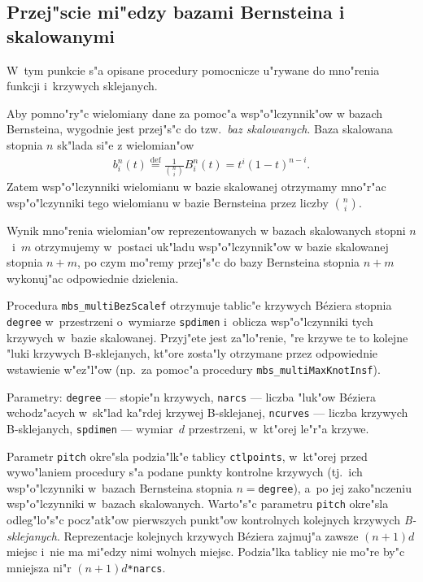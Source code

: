 \newpage
\subsection{Przej"scie mi"edzy bazami Bernsteina i skalowanymi}

W~tym punkcie s"a opisane procedury pomocnicze u"rywane do mno"renia funkcji
i~krzywych sklejanych.

Aby pomno"ry"c wielomiany dane za pomoc"a wsp"o"lczynnik"ow w bazach
Bernsteina, wygodnie jest przej"s"c do tzw.\ \emph{baz skalowanych}. Baza
skalowana stopnia $n$ sk"lada si"e z wielomian"ow
\begin{align}
  b^n_i(t) \stackrel{\mathrm{def}}{=} \frac{1}{\binom{n}{i}}B^n_i(t) =
  t^i(1-t)^{n-i}.
\end{align}
Zatem wsp"o"lczynniki wielomianu w bazie skalowanej otrzymamy mno"r"ac
wsp"o"lczynniki tego wielomianu w bazie Bernsteina przez liczby
$\binom{n}{i}$.

Wynik mno"renia wielomian"ow reprezentowanych w bazach skalowanych stopni
$n$~i~$m$ otrzymujemy w~postaci uk"ladu wsp"o"lczynnik"ow w bazie skalowanej
stopnia $n+m$, po czym mo"remy przej"s"c do bazy Bernsteina stopnia $n+m$
wykonuj"ac odpowiednie dzielenia.

\vspace{\bigskipamount}
Procedura \texttt{mbs\_multiBezScalef} otrzymuje tablic"e krzywych
B\'{e}ziera stopnia \texttt{degree} w~przestrzeni o~wymiarze \texttt{spdimen}
i~oblicza wsp"o"lczynniki tych krzywych w~bazie skalowanej. Przyj"ete jest
za"lo"renie, "re krzywe te to kolejne "luki krzywych B-sklejanych, kt"ore
zosta"ly otrzymane przez odpowiednie wstawienie w"ez"l"ow (np.\ za pomoc"a
procedury \texttt{mbs\_multiMaxKnotInsf}).

\begin{sloppypar}
Parametry: \texttt{degree} --- stopie"n krzywych, \texttt{narcs} --- liczba
"luk"ow B\'{e}ziera wchodz"acych w~sk"lad ka"rdej krzywej B-sklejanej,
\texttt{ncurves} --- liczba krzywych B-sklejanych, \texttt{spdimen} ---
wymiar~$d$ przestrzeni, w~kt"orej le"r"a krzywe.
\end{sloppypar}

Parametr \texttt{pitch} okre"sla podzia"lk"e tablicy \texttt{ctlpoints},
w~kt"orej przed wywo"laniem procedury s"a podane punkty kontrolne krzywych
(tj.\ ich wsp"o"lczynniki w~bazach Bernsteina stopnia $n=$\texttt{degree}),
a~po jej zako"nczeniu wsp"o"lczynniki w~bazach skalowanych.
Warto"s"c parametru \texttt{pitch} okre"sla odleg"lo"s"c pocz"atk"ow
pierwszych punkt"ow kontrolnych kolejnych krzywych \emph{B-sklejanych}.
Reprezentacje kolejnych krzywych B\'{e}ziera zajmuj"a zawsze $(n+1)d$
miejsc i~nie ma mi"edzy nimi wolnych miejsc. Podzia"lka tablicy nie mo"re
by"c mniejsza ni"r $(n+1)d$\texttt{*narcs}.

